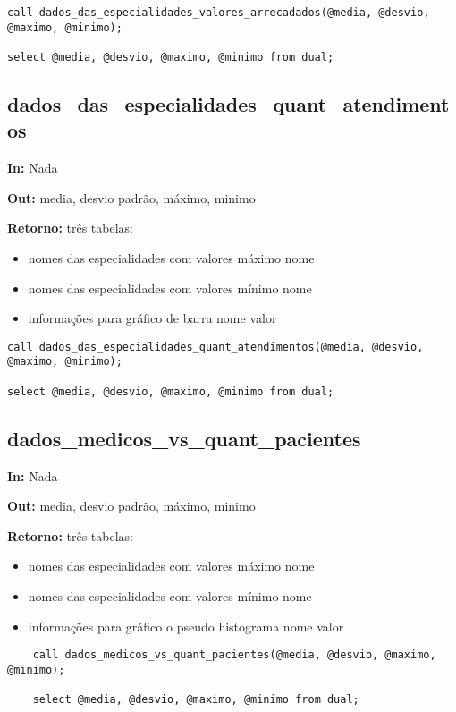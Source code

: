 \begin{verbatim}
call dados_das_especialidades_valores_arrecadados(@media, @desvio, @maximo, @minimo);

select @media, @desvio, @maximo, @minimo from dual;
\end{verbatim}


\subsection{dados\_das\_especialidades\_quant\_atendimentos}

\textbf{In:} Nada

\textbf{Out:} media, desvio padrão, máximo, minimo

\textbf{Retorno:} três tabelas:

\begin{itemize}
	\item nomes das especialidades com valores máximo
	\subitem nome
	\item nomes das especialidades com valores mínimo
	\subitem nome
	\item informações para gráfico de barra
	\subitem nome
	\subitem valor
\end{itemize}

\begin{verbatim}
call dados_das_especialidades_quant_atendimentos(@media, @desvio, @maximo, @minimo);

select @media, @desvio, @maximo, @minimo from dual;
\end{verbatim}


\subsection{dados\_medicos\_vs\_quant\_pacientes}

\textbf{In:} Nada

\textbf{Out:} media, desvio padrão, máximo, minimo

\textbf{Retorno:} três tabelas:

\begin{itemize}
	\item nomes das especialidades com valores máximo
	\subitem nome
	\item nomes das especialidades com valores mínimo
	\subitem nome
	\item informações para gráfico o pseudo histograma
	\subitem nome
	\subitem valor
\end{itemize}

\begin{verbatim}
	call dados_medicos_vs_quant_pacientes(@media, @desvio, @maximo, @minimo);
	
	select @media, @desvio, @maximo, @minimo from dual;
\end{verbatim}


